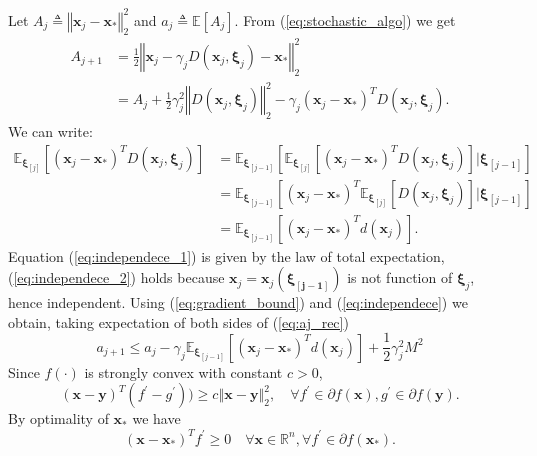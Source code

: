 \documentclass{article}
\renewcommand{\vec}[1]{\boldsymbol{#1}}
\newcommand{\norm}[1]{\left\Vert #1 \right\Vert}
\newcommand{\defeq}{\triangleq}
\begin{document}
Let $A_j\defeq \norm{\vec{x}_j-\vec{x}_*}^2_2$ and $a_j\defeq\mathbb{E}[A_j]$.
From (\ref*{eq:stochastic_algo}) we get
\begin{equation}
\begin{aligned}
	A_{j+1} &= \frac{1}{2}\norm{\vec{x}_j - \gamma_jD(\vec{x}_j,\vec{\xi}_j) -\vec{x}_*}^2_2\\ 
	&= A_j +\frac{1}{2}\gamma_j^2\norm{D(\vec{x}_j,\vec{\xi}_j)}^2_2 - \gamma_j(\vec{x}_j-\vec{x}_*)^TD(\vec{x}_j,\vec{\xi}_j).
\end{aligned}
\label{eq:aj_rec}
\end{equation}
We can write:
\begin{align}
	\mathbb{E}_{\vec{\xi}_{[j]}}[(\vec{x}_j-\vec{x}_*)^TD(\vec{x}_j,\vec{\xi}_j)] &= \mathbb{E}_{\vec{\xi}_{[j-1]}}[\mathbb{E}_{\vec{\xi}_{[j]}}[(\vec{x}_j-\vec{x}_*)^TD(\vec{x}_j,\vec{\xi}_j)]|\vec{\xi}_{[j-1]}] \label{eq:independece_1}\\ 
	&= \mathbb{E}_{\vec{\xi}_{[j-1]}}[(\vec{x}_j-\vec{x}_*)^T\mathbb{E}_{\vec{\xi}_{[j]}}[D(\vec{x}_j,\vec{\xi}_j)]|\vec{\xi}_{[j-1]}]\label{eq:independece_2} \\ 	
	&=\mathbb{E}_{\vec{\xi}_{[j-1]}}[(\vec{x}_j-\vec{x}_*)^Td(\vec{x}_j)].	\label{eq:independece}
\end{align}
Equation (\ref{eq:independece_1}) is given by the law of total expectation, (\ref{eq:independece_2}) holds because $\vec{x}_j = \vec{x}_j(\vec{\xi_{[j-1]}})$ is not function of $\vec{\xi}_j$, hence independent.
Using (\ref{eq:gradient_bound}) and (\ref{eq:independece}) we obtain, taking expectation of both sides of (\ref{eq:aj_rec})
\begin{equation}
	a_{j+1} \leq a_j - \gamma_j\mathbb{E}_{\vec{\xi}_{[j-1]}}[(\vec{x}_j-\vec{x}_*)^Td(\vec{x}_j)] + \frac{1}{2}\gamma_j^2M^2
	\label{eq:aj_rec_2}
\end{equation}
Since $f(\cdot)$ is strongly convex with constant $c>0$,
\begin{equation}
	(\vec{x}-\vec{y})^T(f^\prime- g^\prime))\geq c \norm{\vec{x}-\vec{y}}^2_2, \quad \forall f^\prime\in\partial f(\vec{x}), g^\prime\in\partial f(\vec{y}).
	\label{eq:strong_convexity}
\end{equation}
By optimality of $\vec{x}_*$ we have
\begin{equation}
	(\vec{x}-\vec{x}_*)^T f^\prime \geq 0 \quad \forall \vec{x} \in \mathbb{R}^n, \forall f^\prime\in\partial f(\vec{x}_*).
	\label{eq:optimality}
\end{equation}
\end{document}
